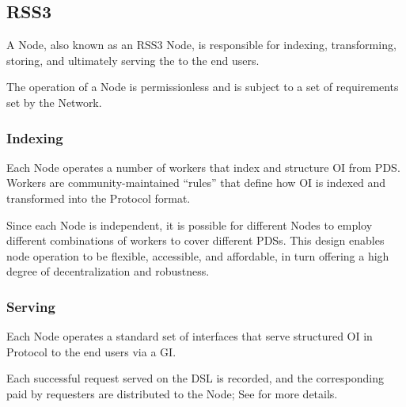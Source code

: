 \subsection{RSS3 }
\label{subsec:SN}

A \gls{Node}, also known as an RSS3 Node, is responsible for indexing, transforming, storing, and ultimately serving the  to the end users.

The operation of a \gls{Node} is permissionless and is subject to a set of requirements set by the Network.

\subsubsection{Indexing}
Each \gls{Node} operates a number of workers that index and structure \gls{OI} from \gls{PDS}.
Workers are community-maintained ``rules'' that define how \gls{OI} is indexed and transformed into the \gls{Protocol} format.

Since each \gls{Node} is independent, it is possible for different \glspl{Node} to employ different combinations of workers to cover different \glspl{PDS}.
This design enables node operation to be flexible, accessible, and affordable, in turn offering a high degree of decentralization and robustness.

\subsubsection{Serving}
Each \gls{Node} operates a standard set of interfaces that serve structured \gls{OI} in \gls{Protocol} to the end users via a \gls{GI}.

Each successful request served on the \gls{DSL} is recorded, and the corresponding  paid by requesters are distributed to the \gls{Node};
See  for more details.
